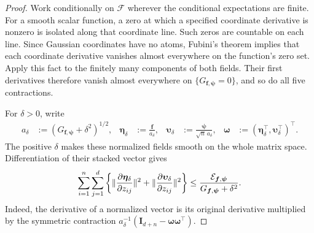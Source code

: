 \documentclass{article}
\theoremstyle{plain}
\theoremstyle{definition}
\theoremstyle{definition}
\DeclarePairedDelimiter\norm{\lVert}{\rVert}
\def\mathbold{\boldsymbol}
\def\bff{\mathbold{f}}\def\fhat{\widehat{f}}\def\hf{\widehat{f}}\def\ftil{\widetilde{f}}
\def\bI{\mathbold{I}}\def\hbI{{\widehat{\bI}}}\def\tbI{{\widetilde{\bI}}}
\begin{document}
\begin{proof}
Work conditionally on $\mathcal F$ wherever the conditional expectations are
finite. For a smooth scalar function, a zero at which a specified coordinate
derivative is nonzero is isolated along that coordinate line. Such zeros are
countable on each line. Since Gaussian coordinates have no atoms, Fubini's
theorem implies that each coordinate derivative vanishes almost everywhere
on the function's zero set. Apply this fact to the finitely many components
of both fields. Their first derivatives therefore vanish almost everywhere
on $\{G_{\bff,\boldsymbol\psi}=0\}$, and so do all five contractions.

For $\delta>0$, write
\begin{align*}
    a_\delta&:=\left(G_{\bff,\boldsymbol\psi}+\delta^2\right)^{1/2},
    & \boldsymbol\eta_\delta&:=\frac{\bff}{a_\delta},
    & \boldsymbol\upsilon_\delta
       &:=\frac{\boldsymbol\psi}{\sqrt n\,a_\delta},
    & \boldsymbol\omega&:=
       (\boldsymbol\eta_\delta^\top,
        \boldsymbol\upsilon_\delta^\top)^\top.
\end{align*}
The positive $\delta$ makes these normalized fields smooth on the whole
matrix space.  Differentiation of their stacked vector gives
\begin{align*}
    \sum_{i=1}^n\sum_{j=1}^d\left\{
       \norm{\pdv{\boldsymbol\eta_\delta}{z_{ij}}}^2
       +\norm{\pdv{\boldsymbol\upsilon_\delta}{z_{ij}}}^2
    \right\}
    \leq
    \frac{\calE_{\bff,\boldsymbol\psi}}
         {G_{\bff,\boldsymbol\psi}+\delta^2}.
\end{align*}
Indeed, the derivative of a normalized vector is its original derivative
multiplied by the symmetric contraction
$a_\delta^{-1}(\bI_{d+n}-\boldsymbol\omega\boldsymbol\omega^\top)$.


\end{proof}
\end{document}
